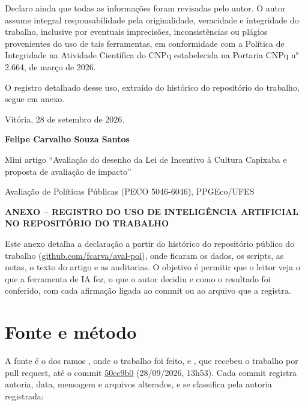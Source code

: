 \documentclass[12pt,a4paper]{article}
\begin{document}
Declaro ainda que todas as informações foram revisadas pelo autor. O autor assume integral
responsabilidade pela originalidade, veracidade e integridade do trabalho, inclusive por eventuais
imprecisões, inconsistências ou plágios provenientes do uso de tais ferramentas, em conformidade com
a Política de Integridade na Atividade Científica do CNPq estabelecida na Portaria CNPq n° 2.664, de
março de 2026.

O registro detalhado desse uso, extraído do histórico do repositório do trabalho, segue em anexo.
\par\endgroup
\vspace{14pt}
\begin{center}
Vitória, 28 de setembro de 2026.\par
\textbf{Felipe Carvalho Souza Santos}\par
{\small Mini artigo ``Avaliação do desenho da Lei de Incentivo à Cultura Capixaba e proposta de avaliação de impacto''\par}
{\small Avaliação de Políticas Públicas (PECO 5046-6046), PPGEco/UFES\par}
\end{center}

\newpage

\begin{center}{\bfseries ANEXO – REGISTRO DO USO DE INTELIGÊNCIA ARTIFICIAL NO REPOSITÓRIO DO TRABALHO\par}\end{center}
\vspace{6pt}
Este anexo detalha a declaração a partir do histórico do repositório público do trabalho
(\href{https://github.com/fcarva/aval-pol}{github.com/fcarva/aval-pol}), onde ficaram os dados, os
scripts, as notas, o texto do artigo e as auditorias. O objetivo é permitir que o leitor veja o que
a ferramenta de IA fez, o que o autor decidiu e como o resultado foi conferido, com cada afirmação
ligada ao commit ou ao arquivo que a registra.

\section{Fonte e método}\label{secao-1}

A fonte é o  dos ramos , onde o trabalho foi
feito, e , que recebeu o trabalho por pull request, até o commit
\href{https://github.com/fcarva/aval-pol/commit/50cc9b02b42b52205f650eb6053f63a078e6a387}{50cc9b0}
(28/09/2026, 13h53). Cada commit registra autoria, data, mensagem e arquivos alterados, e se
classifica pela autoria registrada:
\end{document}
